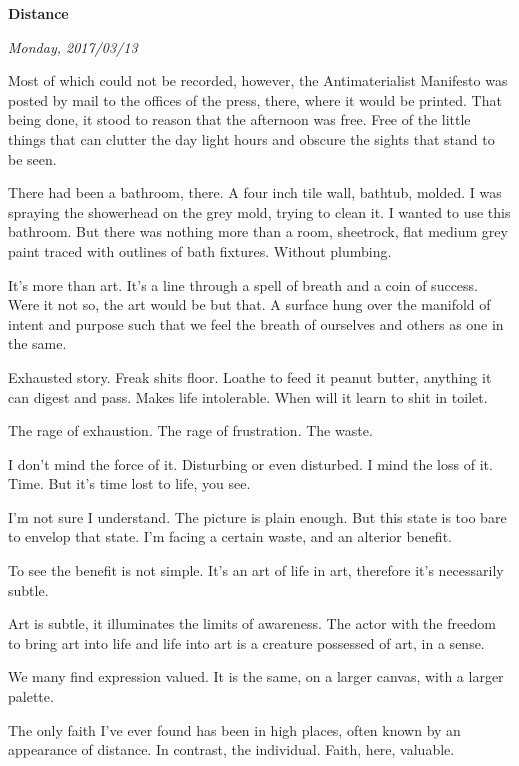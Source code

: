 

\centerline{\bf Distance}
\centerline{\it Monday, 2017/03/13}



\break

﻿Most of which could not be recorded, however, the Antimaterialist
Manifesto was posted by mail to the offices of the press, there, where
it would be printed.  That being done, it stood to reason that the
afternoon was free.  Free of the little things that can clutter the
day light hours and obscure the sights that stand to be seen.

\break

﻿There had been a bathroom, there.  A four inch tile wall, bathtub,
molded.  I was spraying the showerhead on the grey mold, trying to
clean it.  I wanted to use this bathroom.  But there was nothing more
than a room, sheetrock, flat medium grey paint traced with outlines of
bath fixtures.  Without plumbing.

\break

﻿It's more than art.  It's a line through a spell of breath and a coin
of success.  Were it not so, the art would be but that.  A surface
hung over the manifold of intent and purpose such that we feel the
breath of ourselves and others as one in the same.

\break

﻿Exhausted story.  Freak shits floor.  Loathe to feed it peanut butter,
anything it can digest and pass.  Makes life intolerable.  When will
it learn to shit in toilet.

The rage of exhaustion.  The rage of frustration.  The waste.

\break

﻿I don't mind the force of it.  Disturbing or even disturbed.  I mind
the loss of it.  Time.  But it's time lost to life, you see.

I'm not sure I understand.  The picture is plain enough.  But this
state is too bare to envelop that state.  I'm facing a certain waste,
and an alterior benefit.

To see the benefit is not simple.  It's an art of life in art,
therefore it's necessarily subtle.

Art is subtle, it illuminates the limits of awareness.  The actor with
the freedom to bring art into life and life into art is a creature
possessed of art, in a sense.

We many find expression valued.  It is the same, on a larger canvas,
with a larger palette.

\break

﻿The only faith I've ever found has been in high places, often known by
an appearance of distance.  In contrast, the individual.  Faith, here,
valuable.

\bye
